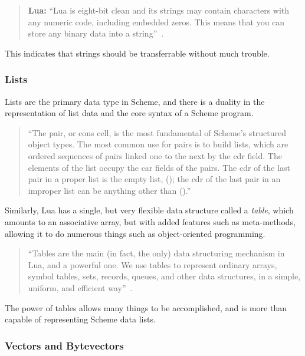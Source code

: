 \begin{quotation}\textbf{Lua:}
``Lua is eight-bit clean and its strings may contain characters with any numeric
code, including embedded zeros. This means that you can store any binary data
into a string''~\cite[p.11]{luabook}.
\end{quotation}

This indicates that strings should be transferrable without much trouble.

\subsubsection{Lists}

Lists are the primary data type in Scheme, and there is a duality in the
representation of list data and the core syntax of a Scheme program.

\begin{quotation}
``The pair, or cons cell, is the most fundamental of Scheme's structured object
types. The most common use for pairs is to build lists, which are ordered
sequences of pairs linked one to the next by the cdr field. The elements of the
list occupy the car fields of the pairs. The cdr of the last pair in a proper
list is the empty list, (); the cdr of the last pair in an improper list can be
anything other than ().''~\cite[Sec~6.4]{tspl}
\end{quotation}


Similarly, Lua has a single, but very flexible data structure called a
\emph{table}, which amounts to an associative array, but with added features
such as meta-methods, allowing it to do numerous things such as object-oriented
programming.
\begin{quotation}
``Tables are the main (in fact, the only) data structuring mechanism in Lua, and
a powerful one. We use tables to represent ordinary arrays, symbol tables, sets,
records, queues, and other data structures, in a simple, uniform, and efficient
way''~\cite[p.14]{luabook}.
\end{quotation}

The power of tables allows many things to be accomplished, and is more than
capable of representing Scheme data lists.


\subsubsection{Vectors and Bytevectors}


